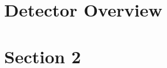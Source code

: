 \documentclass[12pt,twoside]{article}
\begin{document}
\linenumbers
\pagestyle{empty}




\setcounter{page}{1}



\tableofcontents


\renewcommand{\thepage}{\arabic{page}}

\section {Detector Overview}
\label{det_overview}


\section {Section 2}
\label{section2}


\listoftodos[To Do]



\end{document}
